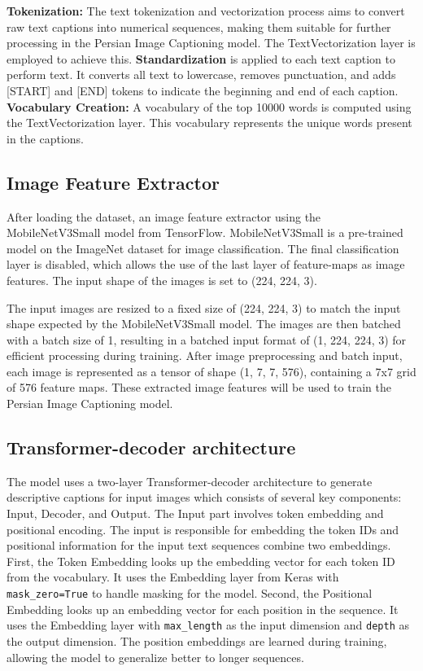 \documentclass[runningheads]{llncs}
\begin{document}
\textbf{Tokenization:}
The text tokenization and vectorization process aims to convert raw text captions into numerical sequences, making them suitable for further processing in the Persian Image Captioning model. The TextVectorization layer is employed to achieve this. \textbf{Standardization} is applied to each text caption to perform text. It converts all text to lowercase, removes punctuation, and adds [START] and [END] tokens to indicate the beginning and end of each caption.
\textbf{Vocabulary Creation:}
A vocabulary of the top 10000 words is computed using the TextVectorization layer. This vocabulary represents the unique words present in the captions.

\subsection{Image Feature Extractor}

After loading the dataset, an image feature extractor using the MobileNetV3Small model from TensorFlow. MobileNetV3Small is a pre-trained model on the ImageNet dataset for image classification. The final classification layer is disabled, which allows the use of the last layer of feature-maps as image features. The input shape of the images is set to (224, 224, 3).

The input images are resized to a fixed size of (224, 224, 3) to match the input shape expected by the MobileNetV3Small model. The images are then batched with a batch size of 1, resulting in a batched input format of (1, 224, 224, 3) for efficient processing during training. After image preprocessing and batch input, each image is represented as a tensor of shape (1, 7, 7, 576), containing a 7x7 grid of 576 feature maps. These extracted image features will be used to train the Persian Image Captioning model.

\subsection{Transformer-decoder architecture}

The model uses a two-layer Transformer-decoder architecture to generate descriptive captions for input images which consists of several key components: Input, Decoder, and Output. The Input part involves token embedding and positional encoding. The input is responsible for embedding the token IDs and positional information for the input text sequences combine two embeddings. First, the Token Embedding looks up the embedding vector for each token ID from the vocabulary. It uses the Embedding layer from Keras with \texttt{mask\_zero=True} to handle masking for the model. Second, the Positional Embedding looks up an embedding vector for each position in the sequence. It uses the Embedding layer with \texttt{max\_length} as the input dimension and \texttt{depth} as the output dimension. The position embeddings are learned during training, allowing the model to generalize better to longer sequences.
\end{document}
